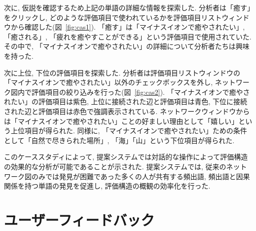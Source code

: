 \documentclass[syuuron]{kuee}
\begin{document}
	次に, 仮説を確認するため上記の単語の詳細な情報を探索した. 
	分析者は「癒す」をクリックし, どのような評価項目で使われているかを評価項目リストウィンドウから確認した(図~\ref{fig:cas1}). 
	「癒す」は「マイナスイオンで癒やされたい」, 「癒される」, 「疲れを癒やすことができる」という評価項目で使用されていた. 
	その中で, 「マイナスイオンで癒やされたい」の詳細について分析者たちは興味を持った. 
	
	次に上位, 下位の評価項目を探索した. 
	分析者は評価項目リストウィンドウの「マイナスイオンで癒やされたい」以外のチェックボックスを外し, 
	ネットワーク図内で評価項目の絞り込みを行った(図~\ref{fig:cas2}). 
	「マイナスイオンで癒やされたい」の評価項目は紫色, 上位に接続された辺と評価項目は青色, 
	下位に接続された辺と評価項目は赤色で強調表示されている. 
	ネットワークウィンドウからは「マイナスイオンで癒やされたい」ことの好ましい理由として「嬉しい」という上位項目が得られた. 
	同様に, 「マイナスイオンで癒やされたい」ための条件として「自然で尽きられた場所」, 「海」「山」という下位項目が得られた. 
	
	このケーススタディによって, 提案システムでは対話的な操作によって評価構造の効果的な分析が可能であることが示された. 
	提案システムでは, 従来のネットワーク図のみでは発見が困難であった多くの人が共有する頻出語, 頻出語と因果関係を持つ単語の発見を促進し, 
	評価構造の概観の効率化を行った. 
	
	\section{ユーザーフィードバック}
\end{document}

